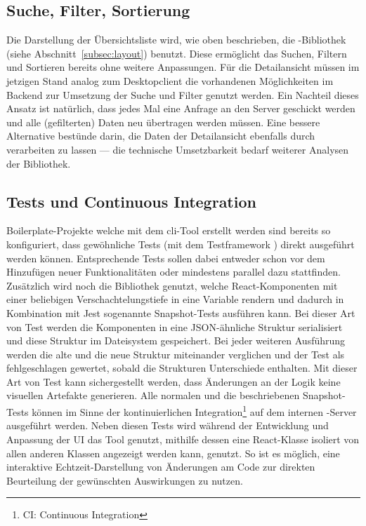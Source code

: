 \subsection{Suche, Filter, Sortierung}
Die Darstellung der Übersichtsliste wird, wie oben beschrieben, die -Bibliothek  (siehe Abschnitt~\ref{subsec:layout}) benutzt. Diese ermöglicht das Suchen, Filtern und Sortieren bereits ohne weitere Anpassungen. Für die Detailansicht müssen im jetzigen Stand analog zum Desktopclient die vorhandenen Möglichkeiten im Backend zur Umsetzung der Suche und Filter genutzt werden. Ein Nachteil dieses Ansatz ist natürlich, dass jedes Mal eine Anfrage an den Server geschickt werden und alle (gefilterten) Daten neu übertragen werden müssen. Eine bessere Alternative bestünde darin, die Daten der Detailansicht ebenfalls durch  verarbeiten zu lassen --- die technische Umsetzbarkeit bedarf weiterer Analysen der Bibliothek.

\subsection{Tests und Continuous Integration}
Boilerplate-Projekte welche mit dem \gls{cli}-Tool  erstellt werden sind bereits so konfiguriert, dass gewöhnliche Tests (mit dem Testframework ) direkt ausgeführt werden können. Entsprechende Tests sollen dabei entweder schon vor dem Hinzufügen neuer Funktionalitäten oder mindestens parallel dazu stattfinden. Zusätzlich wird noch die Bibliothek  genutzt, welche React-Komponenten mit einer beliebigen Verschachtelungstiefe in eine Variable rendern und dadurch in Kombination mit Jest sogenannte Snapshot-Tests ausführen kann. Bei dieser Art von Test werden die Komponenten in eine JSON-ähnliche Struktur serialisiert und diese Struktur im Dateisystem gespeichert. Bei jeder weiteren Ausführung werden die alte und die neue Struktur miteinander verglichen und der Test als fehlgeschlagen gewertet, sobald die Strukturen Unterschiede enthalten. Mit dieser Art von Test kann sichergestellt werden, dass Änderungen an der Logik keine visuellen Artefakte generieren. Alle normalen und die beschriebenen Snapshot-Tests können im Sinne der kontinuierlichen Integration\footnote{CI: Continuous Integration} auf dem internen -Server ausgeführt werden.
Neben diesen Tests wird während der Entwicklung und Anpassung der UI das Tool  genutzt, mithilfe dessen eine React-Klasse isoliert von allen anderen Klassen angezeigt werden kann, genutzt. So ist es möglich, eine interaktive Echtzeit-Darstellung von Änderungen am Code zur direkten Beurteilung der gewünschten Auswirkungen zu nutzen.

